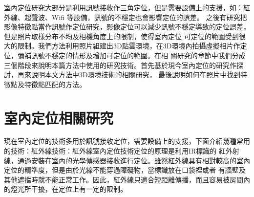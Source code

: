 %
%


	室內定位研究大部分是利用訊號接收作三角定位，但是需要設備上的支援，如：紅外線、超聲波、Wifi 等設備，訊號的不穩定也會影響定位的誤差。
之後有研究把影像特徵點當作訊號作定位研究，影像定位可以減少訊號不穩定導致的定位誤差，但是照片取樣分布不均及相機角度上的限制，使得室內定位
可定位的範圍受到很大的限制。我們方法利用照片組建出3D點雲環境，在3D環境內拍攝虛擬相片作定位，彌補訊號不穩定的情形及增加可定位的範圍。在相
關研究的章節中我們分成三個階段來說明本篇方法中使用的研究技術。首先基於現今室內定位的研究作探討，再來說明本文方法中3D環境技術的相關研究，
最後說明如何在照片中找到特徵點及特徵點匹配的方法。

\section{室內定位相關研究}

	現在室內定位的技術多用於訊號接收定位，需要設備上的支援，下面介紹幾種常用的技術：紅外線技術：紅外線室內定位技術定位的原理是利用IR標識的
紅外射線，通過安裝在室內的光學傳感器接收進行定位。雖然紅外線具有相對較高的室內定位的精準度，但是由於光線不能穿過障礙物，當標識放在口袋裡或者
有牆壁及其他遮擋時就不能正常工作。因此，紅外線只適合短距離傳播，而且容易被房間內的燈光所干擾，在定位上有一定的限制。


